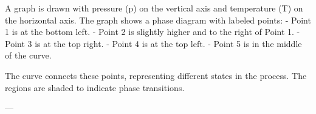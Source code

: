 A graph is drawn with pressure (p) on the vertical axis and temperature (T) on the horizontal axis. The graph shows a phase diagram with labeled points:  
- Point 1 is at the bottom left.  
- Point 2 is slightly higher and to the right of Point 1.  
- Point 3 is at the top right.  
- Point 4 is at the top left.  
- Point 5 is in the middle of the curve.  

The curve connects these points, representing different states in the process. The regions are shaded to indicate phase transitions.

---